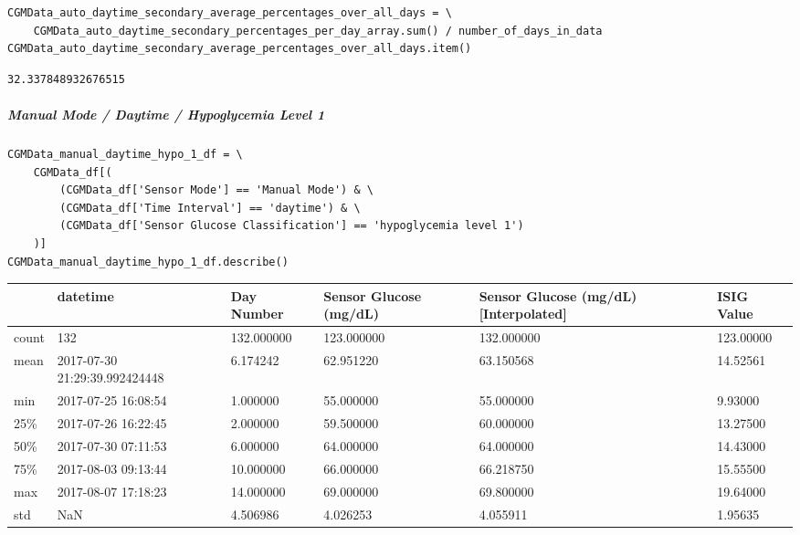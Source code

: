 \begin{verbatim}
CGMData_auto_daytime_secondary_average_percentages_over_all_days = \
    CGMData_auto_daytime_secondary_percentages_per_day_array.sum() / number_of_days_in_data
CGMData_auto_daytime_secondary_average_percentages_over_all_days.item()
\end{verbatim}

\begin{verbatim}
32.337848932676515
\end{verbatim}

\subparagraph{Manual Mode / Daytime / Hypoglycemia Level 1}

\begin{verbatim}
CGMData_manual_daytime_hypo_1_df = \
    CGMData_df[(
        (CGMData_df['Sensor Mode'] == 'Manual Mode') & \
        (CGMData_df['Time Interval'] == 'daytime') & \
        (CGMData_df['Sensor Glucose Classification'] == 'hypoglycemia level 1')
    )]
CGMData_manual_daytime_hypo_1_df.describe()
\end{verbatim}

\bigskip\noindent
\begin{tabular}{p{}p{}p{}p{}p{}p{}}
\toprule
 & datetime & Day Number & Sensor Glucose (mg/dL) & Sensor Glucose (mg/dL) [Interpolated] & ISIG Value \\
\hline
count & 132 & 132.000000 & 123.000000 & 132.000000 & 123.00000 \\
\hline
mean & 2017-07-30 21:29:39.992424448 & 6.174242 & 62.951220 & 63.150568 & 14.52561 \\
\hline
min & 2017-07-25 16:08:54 & 1.000000 & 55.000000 & 55.000000 & 9.93000 \\
\hline
25\% & 2017-07-26 16:22:45 & 2.000000 & 59.500000 & 60.000000 & 13.27500 \\
\hline
50\% & 2017-07-30 07:11:53 & 6.000000 & 64.000000 & 64.000000 & 14.43000 \\
\hline
75\% & 2017-08-03 09:13:44 & 10.000000 & 66.000000 & 66.218750 & 15.55500 \\
\hline
max & 2017-08-07 17:18:23 & 14.000000 & 69.000000 & 69.800000 & 19.64000 \\
\hline
std & NaN & 4.506986 & 4.026253 & 4.055911 & 1.95635 \\
\hline
\bottomrule
\end{tabular}

